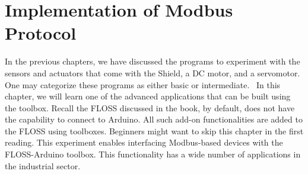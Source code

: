 \chapter {Implementation of Modbus Protocol}
\thispagestyle{empty}
\label{modbus}

\newcommand{\LocMODfig}{\Origin/user-code/modbus/figures}
\newcommand{\LocMODscicode}{\Origin/user-code/modbus/scilab}
\newcommand{\LocMODscibrief}[1]{{\tt \seqsplit{%
        Origin/user-code/modbus/scilab}}, see \fnrefp{fn:file-loc}}
\newcommand{\LocMODardcode}{\Origin/user-code/modbus/arduino}
\newcommand{\LocMODardbrief}[1]{{\tt \seqsplit{%
        Origin/user-code/modbus/arduino}}, see \fnrefp{fn:file-loc}}

\newcommand{\LocMODpycode}{\Origin/user-code/modbus/python}
\newcommand{\LocMODpybrief}[1]{{\tt \seqsplit{%
        Origin/user-code/modbus/python}}, see \fnrefp{fn:file-loc}}


\newcommand{\LocMODjuliacode}{\Origin/user-code/modbus/julia}
\newcommand{\LocMODjuliabrief}[1]{{\tt \seqsplit{%
        Origin/user-code/modbus/julia}}, see \fnrefp{fn:file-loc}}




\newcommand{\LocMODOpenModelicacode}{\Origin/user-code/modbus/OpenModelica}
\newcommand{\LocMODOpenModelicabrief}[1]{{\tt \seqsplit{%
        Origin/user-code/modbus/OpenModelica}}, see \fnrefp{fn:file-loc}}


In the previous chapters, we have discussed the programs to experiment with the sensors and actuators that come with the Shield, a DC motor, and a servomotor. One may categorize these programs as either basic or intermediate.  In this chapter, we will learn one of the advanced applications that can be built using the toolbox. Recall the FLOSS discussed in the book, by default, does not have the capability to connect to Arduino. All such add-on functionalities are added to the FLOSS using toolboxes. Beginners might want to skip this chapter in the first reading. This experiment enables interfacing Modbus-based devices with the FLOSS-Arduino toolbox. This functionality has a wide number of applications in the industrial sector.


